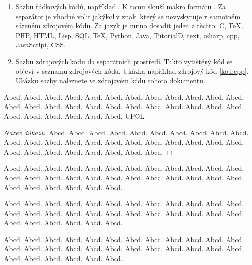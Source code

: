 \documentclass[
  program=itp,
  biblatex,
  figures=false,
  glossaries,
  index
]{kidiplom}
\begin{document}
\begin{enumerate}
\item Sazbu řádkových kódů, například . K tomu slouží makro formátu . Za separátor je vhodné volit jakýkoliv znak, který se nevyskytuje v samotném sázeném zdrojovém kódu. Za jazyk je nutno dosadit jeden z těchto: C, TeX, PHP, HTML, Lisp, SQL, TeX, Python, Java, TutorialD, text, csharp, cpp, JavaScript, CSS.

\item Sazbu zdrojových kódu do separátních prostředí. Takto vytištěný kód se objeví v seznamu zdrojových kódů. Ukázka například zdrojový kód \ref{kod:cpp}. Ukázku sazby naleznete ve zdrojovém kódu tohoto dokumentu.
\end{enumerate}


\begin{definition}
Abcd. Abcd. Abcd. Abcd. Abcd. Abcd. Abcd. Abcd. Abcd. Abcd. Abcd. Abcd. Abcd. Abcd. Abcd. Abcd. Abcd. Abcd. Abcd. Abcd. Abcd. Abcd. Abcd. Abcd. Abcd. Abcd. Abcd. Abcd. Abcd. Abcd. \gls{UPOL}
\end{definition}

\begin{proof}[Název důkazu]
Abcd. Abcd. Abcd. Abcd. Abcd. Abcd. Abcd. Abcd. Abcd. Abcd. Abcd. Abcd. Abcd. Abcd. Abcd. Abcd. Abcd. Abcd. Abcd. Abcd. Abcd. Abcd. Abcd. Abcd. Abcd. Abcd. Abcd. Abcd. Abcd. Abcd.
\end{proof}

\begin{remark}
Abcd. Abcd. Abcd. Abcd. Abcd. Abcd. Abcd. Abcd. Abcd. Abcd. Abcd. Abcd. Abcd. Abcd. Abcd. Abcd. Abcd. Abcd. Abcd. Abcd. Abcd. Abcd. Abcd. Abcd. Abcd. Abcd. Abcd. Abcd. Abcd. Abcd.
\end{remark}

\begin{example}
Abcd. Abcd. Abcd. Abcd. Abcd. Abcd. Abcd. Abcd. Abcd. Abcd. Abcd. Abcd. Abcd. Abcd. Abcd. Abcd. Abcd. Abcd. Abcd. Abcd. Abcd. Abcd. Abcd. Abcd. Abcd. Abcd. Abcd. Abcd. Abcd. Abcd.
\end{example}

\begin{lemma}
Abcd. Abcd. Abcd. Abcd. Abcd. Abcd. Abcd. Abcd. Abcd. Abcd. Abcd. Abcd. Abcd. Abcd. Abcd. Abcd. Abcd. Abcd. Abcd. Abcd. Abcd. Abcd. Abcd. Abcd. Abcd. Abcd. Abcd. Abcd. Abcd. Abcd.
\end{lemma}
\end{document}
